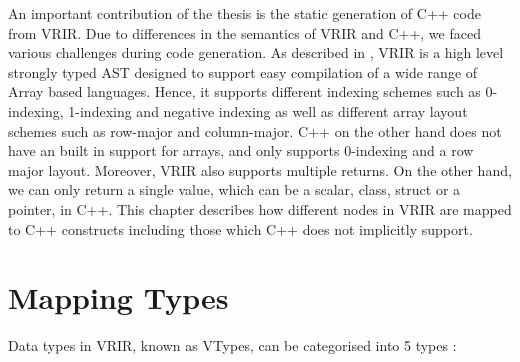 An important contribution of the thesis is the static generation of C++ code from VRIR. Due to differences in the semantics of VRIR and C++, we faced various challenges during code generation. As described in , VRIR is a high level strongly typed AST designed to support easy compilation of a wide range of Array based languages. Hence, it supports different indexing schemes such as 0-indexing, 1-indexing and negative indexing as well as different array layout schemes such as row-major and column-major. C++ on the other hand does not have an built in support for arrays, and only supports 0-indexing and a row major layout. Moreover, VRIR also supports multiple returns. On the other hand, we can only return a single value, which can be a scalar, class, struct or a pointer, in C++. This chapter describes how different nodes in VRIR are mapped to C++ constructs including those which C++ does not implicitly support.
\section{Mapping Types}
Data types in VRIR, known as VTypes, can be categorised into 5 types :
